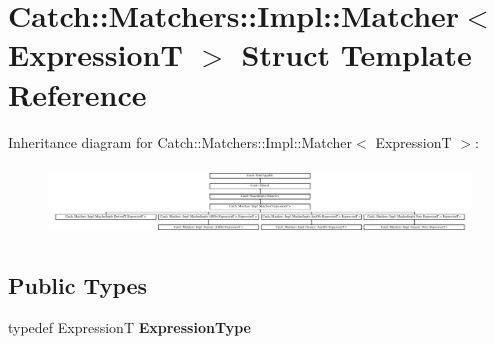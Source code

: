 \hypertarget{structCatch_1_1Matchers_1_1Impl_1_1Matcher}{}\section{Catch\+:\+:Matchers\+:\+:Impl\+:\+:Matcher$<$ ExpressionT $>$ Struct Template Reference}
\label{structCatch_1_1Matchers_1_1Impl_1_1Matcher}
Inheritance diagram for Catch\+:\+:Matchers\+:\+:Impl\+:\+:Matcher$<$ ExpressionT $>$\+:\begin{figure}[H]
\begin{center}
\leavevmode
\includegraphics[height=1.879195cm]{structCatch_1_1Matchers_1_1Impl_1_1Matcher}
\end{center}
\end{figure}
\subsection*{Public Types}
\begin{DoxyCompactItemize}
\item 
\mbox{\label{structCatch_1_1Matchers_1_1Impl_1_1Matcher_a7f5068cbacd1eed06cf243e63446e7e1}} 
typedef ExpressionT {\bfseries Expression\+Type}
\end{DoxyCompactItemize}

